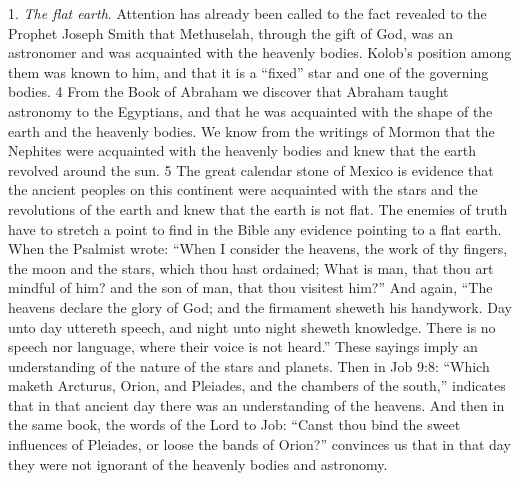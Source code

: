 1. \textit{The flat earth}. Attention has already been called to the fact revealed to the Prophet Joseph
Smith that Methuselah, through the gift of God, was an astronomer and was acquainted with
the heavenly bodies. Kolob's position among them was known to him, and that it is a ``fixed''
star and one of the governing bodies. 4 From the Book of Abraham we discover that
Abraham taught astronomy to the Egyptians, and that he was acquainted with the shape of
the earth and the heavenly bodies. We know from the writings of Mormon that the Nephites
were acquainted with the heavenly bodies and knew that the earth revolved around the sun. 5
The great calendar stone of Mexico is evidence that the ancient peoples on this continent
were acquainted with the stars and the revolutions of the earth and knew that the earth is not
flat. The enemies of truth have to stretch a point to find in the Bible any evidence pointing to
a flat earth. When the Psalmist wrote: ``When I consider the heavens, the work of thy fingers,
the moon and the stars, which thou hast ordained; What is man, that thou art mindful of him?
and the son of man, that thou visitest him?'' And again, ``The heavens declare the glory of
God; and the firmament sheweth his handywork. Day unto day uttereth speech, and night
unto night sheweth knowledge. There is no speech nor language, where their voice is not
heard.'' These sayings imply an understanding of the nature of the stars and planets. Then in
Job 9:8: ``Which maketh Arcturus, Orion, and Pleiades, and the chambers of the south,''
indicates that in that ancient day there was an understanding of the heavens. And then in the
same book, the words of the Lord to Job: ``Canst thou bind the sweet influences of Pleiades,
or loose the bands of Orion?'' convinces us that in that day they were not ignorant of the
heavenly bodies and astronomy.

